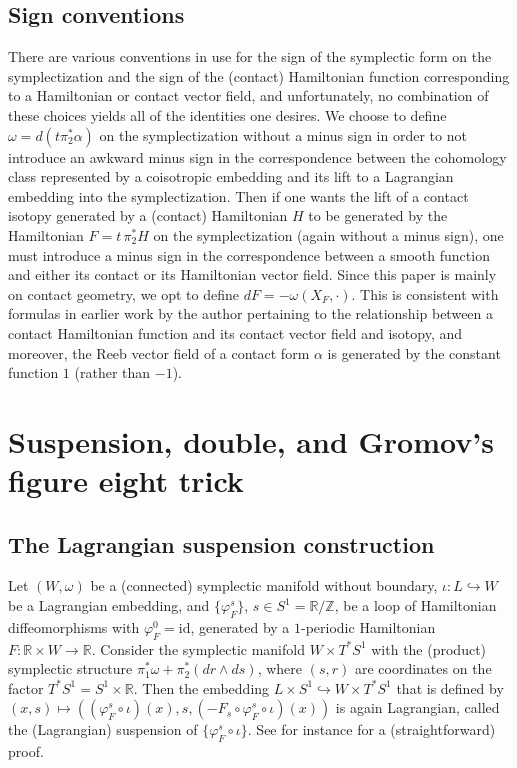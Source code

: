 \documentclass{amsart}
\theoremstyle{remark}
\def\id{{\textrm{id}}}
\def\R{{\mathbb R}}
\def\Z{{\mathbb Z}}
\begin{document}
\subsection{Sign conventions}
There are various conventions in use for the sign of the symplectic form on the symplectization and the sign of the (contact) Hamiltonian function corresponding to a Hamiltonian or contact vector field, and unfortunately, no combination of these choices yields all of the identities one desires.
We choose to define $\omega = d (t \pi_2^* \alpha)$ on the symplectization without a minus sign in order to not introduce an awkward minus sign in the correspondence between the cohomology class represented by a coisotropic embedding and its lift to a Lagrangian embedding into the symplectization.
Then if one wants the lift of a contact isotopy generated by a (contact) Hamiltonian $H$ to be generated by the Hamiltonian $F = t \, \pi_2^* H$ on the symplectization (again without a minus sign), one must introduce a minus sign in the correspondence between a smooth function and either its contact or its Hamiltonian vector field.
Since this paper is mainly on contact geometry, we opt to define $dF = - \omega (X_F, \cdot)$.
This is consistent with formulas in earlier work by the author pertaining to the relationship between a contact Hamiltonian function and its contact vector field and isotopy, and moreover, the Reeb vector field of a contact form $\alpha$ is generated by the constant function $1$ (rather than $- 1$).

\section{Suspension, double, and Gromov's figure eight trick} \label{sec:suspension}

\subsection{The Lagrangian suspension construction}
Let $(W, \omega)$ be a (connected) symplectic manifold without boundary, $\iota \colon L \hookrightarrow W$ be a Lagrangian embedding, and $\{ \varphi_F^s \}$, $s \in S^1 = \R / \Z$, be a loop of Hamiltonian diffeomorphisms with $\varphi_F^0 = \id$, generated by a $1$-periodic Hamiltonian $F \colon \R \times W \to \R$.
Consider the symplectic manifold $W \times T^* S^1$ with the (product) symplectic structure $\pi_1^* \omega + \pi_2^* (dr \wedge ds)$, where $(s, r)$ are coordinates on the factor $T^* S^1 = S^1 \times \R$.
Then the embedding $L \times S^1 \hookrightarrow W \times T^* S^1$ that is defined by $(x, s) \mapsto ( (\varphi_F^s \circ \iota) (x), s, (- F_s \circ \varphi_F^s \circ \iota) (x) )$ is again Lagrangian, called the (Lagrangian) suspension of $\{ \varphi_F^s \circ \iota \}$.
See for instance \cite[Subsection~3.1.E]{polterovich:ggs01} for a (straightforward) proof.
\end{document}

